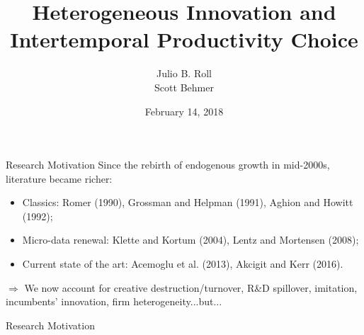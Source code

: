 \documentclass[11pt]{beamer}
\author{Julio B. Roll \\ Scott Behmer}
\title{Heterogeneous Innovation and Intertemporal Productivity Choice}
\date{February 14, 2018}
\begin{document}
\begin{frame}
	\maketitle
\end{frame}

\begin{frame}{Research Motivation}
	Since the rebirth of endogenous growth in mid-2000s, literature became richer:
	\begin{itemize}\itemsep12pt
	\item Classics: Romer (1990), Grossman and Helpman (1991), Aghion and Howitt (1992);
	\item Micro-data renewal: Klette and Kortum (2004), Lentz and Mortensen (2008);
	\item Current state of the art: Acemoglu et al. (2013), Akcigit and Kerr (2016).
	\end{itemize}
$\Rightarrow$ We now account for creative destruction/turnover, R\&D spillover, imitation, incumbents' innovation, firm heterogeneity...but...
\end{frame}


\begin{frame}{Research Motivation}
	\begin{center}
	\begin{figure}\centering\label{Ratio_firms}
	\end{figure}
	\end{center}
\end{frame}
\end{document}
